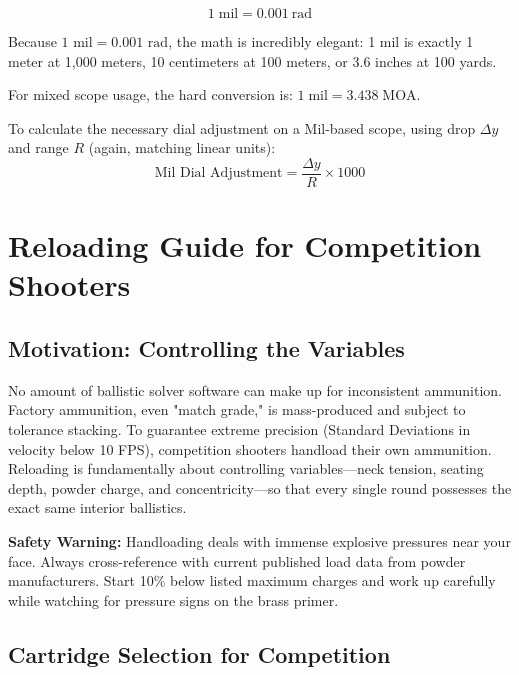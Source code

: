 \documentclass[11pt,twoside,openright]{report}
\begin{document}
\begin{equation}
  1\;\text{mil} = \SI{0.001}{\radian} 
  \label{eq:mil}
\end{equation}

Because $1 \text{ mil} = 0.001 \text{ rad}$, the math is incredibly elegant: 1 mil is exactly 1 meter at 1,000 meters, 10 centimeters at 100 meters, or $3.6$ inches at 100 yards.

For mixed scope usage, the hard conversion is: $1\;\text{mil} = 3.438\;\text{MOA}$.

To calculate the necessary dial adjustment on a Mil-based scope, using drop $\Delta y$ and range $R$ (again, matching linear units):
\begin{equation}
  \boxed{\text{Mil Dial Adjustment} = \frac{\Delta y}{R} \times 1000}
  \label{eq:mil_calc}
\end{equation}


\chapter{Reloading Guide for Competition Shooters}
\label{ch:reloading}

\section{Motivation: Controlling the Variables}

No amount of ballistic solver software can make up for inconsistent ammunition. Factory ammunition, even "match grade," is mass-produced and subject to tolerance stacking. To guarantee extreme precision (Standard Deviations in velocity below 10 FPS), competition shooters handload their own ammunition. Reloading is fundamentally about controlling variables—neck tension, seating depth, powder charge, and concentricity—so that every single round possesses the exact same interior ballistics.

\textbf{Safety Warning:} Handloading deals with immense explosive pressures near your face. Always cross-reference with current published load data from powder manufacturers. Start 10\% below listed maximum charges and work up carefully while watching for pressure signs on the brass primer.

\section{Cartridge Selection for Competition}
\end{document}
